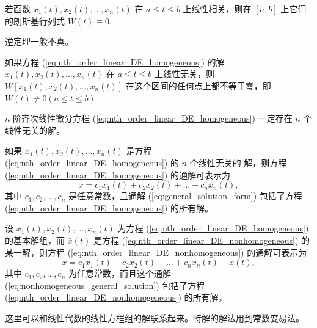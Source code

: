 \begin{theorem}[朗斯基行列式与线性相关性]\label{thm:Wronskian_linear_dependence}
若函数 $x_1(t), x_2(t), \dots, x_n(t)$ 在 $a \le t \le b$ 上线性相关，则在 $[a,b]$ 上它们
的朗斯基行列式 $W(t) \equiv 0$.
\end{theorem}
\begin{remark}
    逆定理一般不真。
\end{remark}

\begin{theorem}[朗斯基行列式与线性无关性]\label{thm:Wronskian_linear_independence}
如果方程 (\ref{eq:nth_order_linear_DE_homogeneous}) 的解 $x_1(t), x_2(t), \dots, x_n(t)$ 在 $a \le t \le b$ 上线性无关，则
$W[x_1(t), x_2(t), \dots, x_n(t)]$ 在这个区间的任何点上都不等于零，即 $W(t) \ne 0 (a \le t \le b)$.
\end{theorem}

\begin{theorem}[n阶齐次线性微分方程解的存在性]\label{thm:n_linearly_independent_solutions}
    $n$ 阶齐次线性微分方程 (\ref{eq:nth_order_linear_DE_homogeneous}) 一定存在 $n$ 个线性无关的解。
\end{theorem}


\begin{theorem}[n阶齐次线性微分方程通解结构]\label{thm:general_solution_structure}
    如果 $x_1(t), x_2(t), \dots, x_n(t)$ 是方程 (\ref{eq:nth_order_linear_DE_homogeneous}) 的 $n$ 个线性无关的
解，则方程 (\ref{eq:nth_order_linear_DE_homogeneous}) 的通解可表示为
\begin{equation}
x=c_1x_1(t)+c_2x_2(t)+\dots+c_nx_n(t), \label{eq:general_solution_form}
\end{equation}
其中 $c_1,c_2,\dots,c_n$ 是任意常数，且通解 (\ref{eq:general_solution_form}) 包括了方程 (\ref{eq:nth_order_linear_DE_homogeneous}) 的所有解。
\end{theorem}

\begin{theorem}[n阶非齐次线性微分方程通解结构]\label{thm:general_solution_nonhomogeneous}
设 $x_1(t), x_2(t), \dots, x_n(t)$ 为方程 (\ref{eq:nth_order_linear_DE_homogeneous}) 的基本解组，而 $\bar{x}(t)$ 是方程 (\ref{eq:nth_order_linear_DE_nonhomogeneous}) 的
某一解，则方程 (\ref{eq:nth_order_linear_DE_nonhomogeneous}) 的通解可表示为
\begin{equation}
x=c_1x_1(t)+c_2x_2(t)+\dots+c_nx_n(t)+\bar{x}(t), \label{eq:nonhomogeneous_general_solution}
\end{equation}
其中 $c_1,c_2,\dots,c_n$ 为任意常数，而且这个通解 (\ref{eq:nonhomogeneous_general_solution}) 包括了方程 (\ref{eq:nth_order_linear_DE_nonhomogeneous}) 的所有解。
\end{theorem}
\begin{remark}
    这里可以和线性代数的线性方程组的解联系起来。特解的解法用到常数变易法。
\end{remark}

